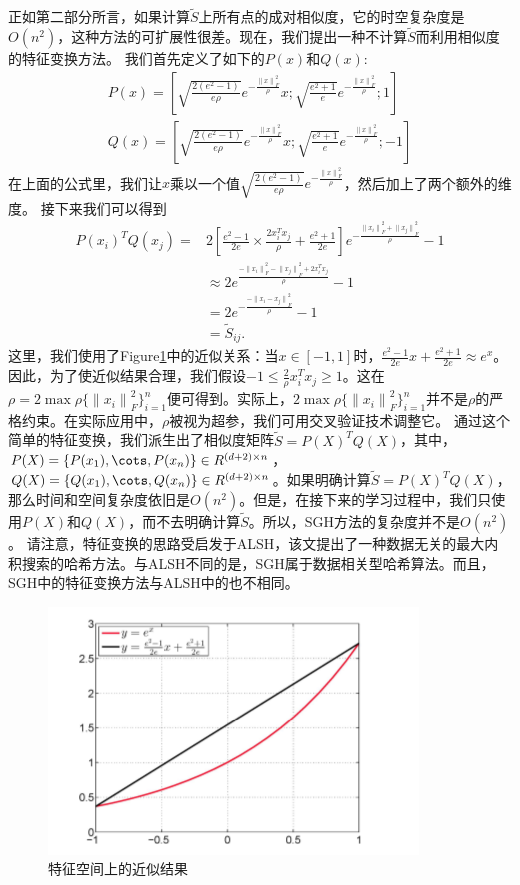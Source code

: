 \message{ !name(SGH.tex)}\documentclass[prodmode,acmtecs]{acmsmall}
\begin{document}
正如第二部分所言，如果计算$\tilde{S}$上所有点的成对相似度，它的时空复杂度是$O(n^2)$，这种方法的可扩展性很差。现在，我们提出一种不计算$\tilde{S}$而利用相似度的特征变换方法。
我们首先定义了如下的$P(x)$和$Q(x)$:
\begin{equation}
\begin{split}
P(x)=[\sqrt{\frac{2(e^2-1)}{e\rho}}e^{-\frac{{\|x\|}^2_F}{\rho}}x;\sqrt{\frac{e^2+1}{e}}e^{-\frac{{\|x\|}^2_F}{\rho}};1]\\
Q(x)=[\sqrt{\frac{2(e^2-1)}{e\rho}}e^{-\frac{{\|x\|}^2_F}{\rho}}x;\sqrt{\frac{e^2+1}{e}}e^{-\frac{{\|x\|}^2_F}{\rho}};-1]
\end{split}
\end{equation}
在上面的公式里，我们让$x$乘以一个值$\sqrt{\frac{2(e^2-1)}{e\rho}}e^{-\frac{{\|x\|}^2_F}{\rho}}$，然后加上了两个额外的维度。
接下来我们可以得到
\begin{equation*}
\begin{split}
P(x_i)^TQ(x_j)=&2[\frac{e^2-1}{2e}\times \frac{2x^T_ix_j}{\rho}+\frac{e^2+1}{2e}]e^{-\frac{{\|x_i\|}^2_F+{\|x_j\|}^2_F}{\rho}}-1\\
&\approx 2e^{\frac{-{\|x_i\|}^2_F-{\|x_j\|}^2_F+2x^T_ix_j}{\rho}}-1\\
&=  2e^{-\frac{-{\|x_i-x_j\|}^2_F}{\rho}}-1\\
&= \tilde{S}_{ij}.
\end{split}
\end{equation*}
这里，我们使用了Figure\ref{fig:one}中的近似关系：当$x\in [-1,1]$时，$\frac{e^2-1}{2e}x+\frac{e^2+1}{2e}\approx e^x$。因此，为了使近似结果合理，我们假设$-1\leq \frac{2}{\rho}x^T_ix_j \geq 1$。这在$\rho = 2\max\rho\{{\|x_i\|}^2_F\}^n_{i=1}$便可得到。实际上，$2\max\rho\{{\|x_i\|}^2_F\}^n_{i=1}$并不是$\rho$的严格约束。在实际应用中，$\rho$被视为超参，我们可用交叉验证技术调整它。
通过这个简单的特征变换，我们派生出了相似度矩阵$\tilde{S} = P(X)^TQ(X)$，其中，$P(X)=\{P(x_1),\cots,P(x_n)\}\in R^{(d+2)\times n}$， $Q(X)=\{Q(x_1),\cots,Q(x_n)\}\in R^{(d+2)\times n}$。如果明确计算$\tilde{S} = P(X)^TQ(X)$，那么时间和空间复杂度依旧是$O(n^2)$。但是，在接下来的学习过程中，我们只使用$P(X)$和$Q(X)$，而不去明确计算$\tilde{S}$。所以，SGH方法的复杂度并不是$O(n^2)$。
请注意，特征变换的思路受启发于ALSH\cite{NIPS2014_5329}，该文提出了一种数据无关的最大内积搜索的哈希方法。与ALSH不同的是，SGH属于数据相关型哈希算法。而且，SGH中的特征变换方法与ALSH中的也不相同。

\begin{figure}[htbp]%
\centering
\includegraphics[width=0.5\paperwidth]{figure1.png}
\caption{特征空间上的近似结果}
\label{fig:one}
\end{figure}
\end{document}
